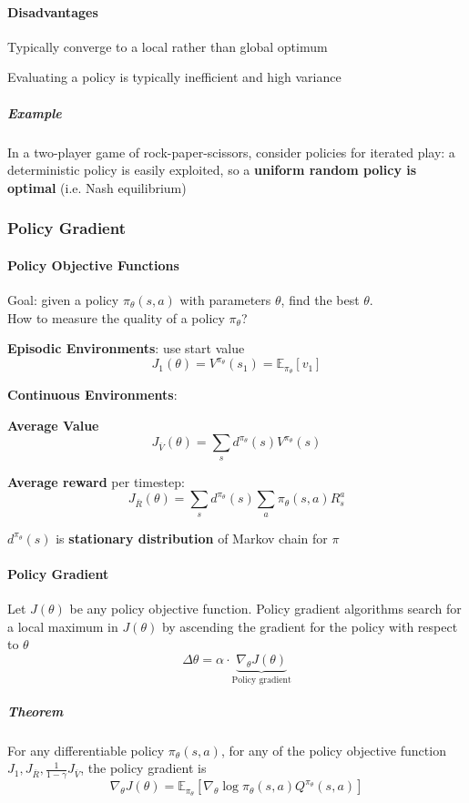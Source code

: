 \documentclass[10pt]{report}
\begin{document}
\paragraph{Disadvantages}
\begin{list}{}{}
	\item Typically converge to a local rather than global optimum
	\item Evaluating a policy is typically inefficient and high variance
\end{list}
\subparagraph{Example} In a two-player game of rock-paper-scissors, consider policies for iterated play: a deterministic policy is easily exploited, so a \textbf{uniform random policy is optimal} (i.e. Nash equilibrium)
\subsubsection{Policy Gradient}
\paragraph{Policy Objective Functions} Goal: given a policy $\pi_\theta(s,a)$ with parameters $\theta$, find the best $\theta$.\\
How to measure the quality of a policy $\pi_\theta$?
\begin{list}{}{}
	\item \textbf{Episodic Environments}: use start value
	$$J_1(\theta) = V^{\pi_\theta}(s_1) = \mathbb{E}_{\pi_\theta}[v_1]$$
	\item \textbf{Continuous Environments}:
	\begin{list}{}{}
		\item \textbf{Average Value} $$J_{\overline{V}}(\theta) = \sum_s d^{\pi_\theta}(s)V^{\pi_\theta}(s)$$
		\item \textbf{Average reward} per timestep: $$J_{\overline{R}}(\theta) = \sum_s d^{\pi_\theta}(s)\sum_a\pi_\theta(s,a)R_s^a$$
		\item $d^{\pi_\theta}(s)$ is \textbf{stationary distribution} of Markov chain for $\pi$
	\end{list}
\end{list}
\paragraph{Policy Gradient} Let $J(\theta)$ be any policy objective function. Policy gradient algorithms search for a local maximum in $J(\theta)$ by ascending the gradient for the policy with respect to $\theta$
$$\Delta\theta=\alpha\cdot\underset{\text{Policy gradient}}{\underbrace{\nabla_\theta J(\theta)}}$$
\subparagraph{Theorem} For any differentiable policy $\pi_\theta(s,a)$, for any of the policy objective function $J_1,J_{\overline{R}},\frac{1}{1-\gamma}J_{\overline{V}}$, the policy gradient is
$$\nabla_\theta J(\theta)= \mathbb{E}_{\pi_\theta}\left[\nabla_\theta\log\pi_\theta(s,a)Q^{\pi_\theta}(s,a)\right]$$
\end{document}
